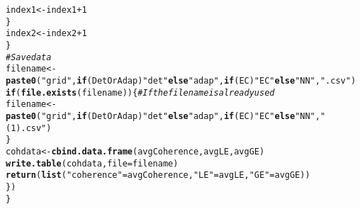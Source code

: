 \documentclass{article}\usepackage[]{graphicx}\usepackage[]{color}
\makeatletter
\newcommand{\hlnum}[1]{\textcolor[rgb]{0.686,0.059,0.569}{#1}}%
\newcommand{\hlstr}[1]{\textcolor[rgb]{0.192,0.494,0.8}{#1}}%
\newcommand{\hlcom}[1]{\textcolor[rgb]{0.678,0.584,0.686}{\textit{#1}}}%
\newcommand{\hlopt}[1]{\textcolor[rgb]{0,0,0}{#1}}%
\newcommand{\hlstd}[1]{\textcolor[rgb]{0.345,0.345,0.345}{#1}}%
\newcommand{\hlkwa}[1]{\textcolor[rgb]{0.161,0.373,0.58}{\textbf{#1}}}%
\newcommand{\hlkwb}[1]{\textcolor[rgb]{0.69,0.353,0.396}{#1}}%
\newcommand{\hlkwc}[1]{\textcolor[rgb]{0.333,0.667,0.333}{#1}}%
\newcommand{\hlkwd}[1]{\textcolor[rgb]{0.737,0.353,0.396}{\textbf{#1}}}%
\newenvironment{kframe}{%
 \def\at@end@of@kframe{}%
 \ifinner\ifhmode%
  \def\at@end@of@kframe{\end{minipage}}%
  \begin{minipage}{\columnwidth}%
 \fi\fi%
 \def\FrameCommand##1{\hskip\@totalleftmargin \hskip-\fboxsep
 \colorbox{shadecolor}{##1}\hskip-\fboxsep
     \hskip-\linewidth \hskip-\@totalleftmargin \hskip\columnwidth}%
 \MakeFramed {\advance\hsize-\width
   \@totalleftmargin\z@ \linewidth\hsize
   \@setminipage}}%
 {\par\unskip\endMakeFramed%
 \at@end@of@kframe}
\newenvironment{knitrout}{}{} %
\makeatother
\begin{document}
\begin{knitrout}
\begin{kframe}
\begin{alltt}
     \hlstd{index1}\hlkwb{<-}\hlstd{index1}\hlopt{+}\hlnum{1}
   \hlstd{\}}
   \hlstd{index2}\hlkwb{<-}\hlstd{index2}\hlopt{+}\hlnum{1}
  \hlstd{\}}
  \hlcom{#Save data}
  \hlstd{filename}\hlkwb{<-}\hlkwd{paste0}\hlstd{(}\hlstr{"grid"}\hlstd{,}\hlkwa{if}\hlstd{(DetOrAdap)} \hlstr{"det"} \hlkwa{else} \hlstr{"adap"}\hlstd{,}\hlkwa{if}\hlstd{(EC)} \hlstr{"EC"} \hlkwa{else} \hlstr{"NN"}\hlstd{,}\hlstr{".csv"}\hlstd{)}
  \hlkwa{if}\hlstd{(}\hlkwd{file.exists}\hlstd{(filename))\{} \hlcom{#If the filename is already used}
    \hlstd{filename} \hlkwb{<-}\hlkwd{paste0}\hlstd{(}\hlstr{"grid"}\hlstd{,}\hlkwa{if}\hlstd{(DetOrAdap)} \hlstr{"det"} \hlkwa{else} \hlstr{"adap"}\hlstd{,}\hlkwa{if}\hlstd{(EC)} \hlstr{"EC"} \hlkwa{else} \hlstr{"NN"}\hlstd{,}\hlstr{"(1).csv"}\hlstd{)}
  \hlstd{\}}
  \hlstd{cohdata} \hlkwb{<-} \hlkwd{cbind.data.frame}\hlstd{(avgCoherence,avgLE,avgGE)}
  \hlkwd{write.table}\hlstd{(cohdata,}\hlkwc{file}\hlstd{=filename)}
  \hlkwd{return}\hlstd{(}\hlkwd{list}\hlstd{(}\hlstr{"coherence"}\hlstd{=avgCoherence,} \hlstr{"LE"}\hlstd{=avgLE,}\hlstr{"GE"}\hlstd{=avgGE))}
       \hlstd{\})}
\hlstd{\}}
\end{alltt}
\end{kframe}
\end{knitrout}
\end{document}

